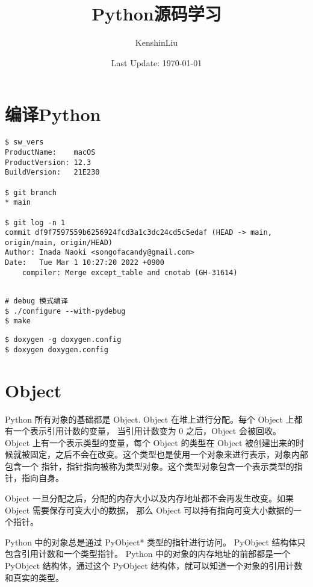 \documentclass[12pt]{article}
\title{Python源码学习}
\author{KenshinLiu}
\date{Last Update: \today}                                           %
\begin{document}
\maketitle
\newpage

\section*{编译Python}

\begin{lstlisting}[caption={编译使用的操作系统和 Python 版本信息}]
$ sw_vers
ProductName:	macOS
ProductVersion:	12.3
BuildVersion:	21E230

$ git branch
* main

$ git log -n 1
commit df9f7597559b6256924fcd3a1c3dc24cd5c5edaf (HEAD -> main, origin/main, origin/HEAD)
Author: Inada Naoki <songofacandy@gmail.com>
Date:   Tue Mar 1 10:27:20 2022 +0900
    compiler: Merge except_table and cnotab (GH-31614)
    
\end{lstlisting}


\begin{lstlisting}[caption={编译命令}]
# debug 模式编译
$ ./configure --with-pydebug
$ make
\end{lstlisting}


\begin{lstlisting}[caption={doxygen生成调用关系}]
$ doxygen -g doxygen.config
$ doxygen doxygen.config
\end{lstlisting}

\section*{Object}

Python 所有对象的基础都是 Object. Object 在堆上进行分配。每个 Object 上都有一个表示引用计数的变量，
当引用计数变为 0 之后，Object 会被回收。 Object 上有一个表示类型的变量，每个 Object 的类型在 Object
 被创建出来的时候就被固定，之后不会在改变。这个类型也是使用一个对象来进行表示，对象内部包含一个
 指针，指针指向被称为类型对象。这个类型对象包含一个表示类型的指针，指向自身。
 
 Object 一旦分配之后，分配的内存大小以及内存地址都不会再发生改变。如果 Object 需要保存可变大小的数据，
 那么 Object 可以持有指向可变大小数据的一个指针。

Python 中的对象总是通过 PyObject* 类型的指针进行访问。 PyObject 结构体只包含引用计数和一个类型指针。
Python 中的对象的内存地址的前部都是一个 PyObject 结构体，通过这个 PyObject 结构体，就可以知道一个对象的引用计数和真实的类型。
\end{document}
